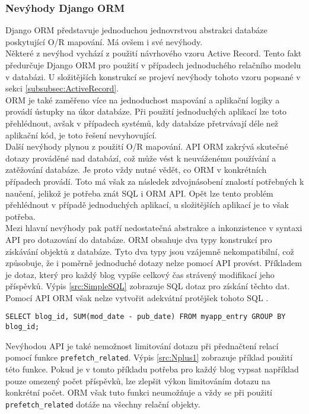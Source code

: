 \documentclass[ing,male,java,dept456]{diploma}						%
\begin{document}
\subsubsection{Nevýhody Django ORM}

Django ORM představuje jednoduchou jednovrstvou abstrakci databáze poskytující O/R mapování. Má ovšem i své nevýhody. \\
Některé z nevýhod vychází z použití návrhového vzoru Active Record. Tento fakt předurčuje Django ORM pro použití v případech jednoduchého relačního modelu v databázi. U složitějších konstrukcí se projeví nevýhody tohoto vzoru popsané v sekci \ref{subsubsec:ActiveRecord}. \\
ORM je také zaměřeno více na jednoduchost mapování a aplikační logiky a provádí ústupky na úkor databáze. Při použití jednoduchých aplikací lze toto přehlédnout, avšak v případech systémů, kdy databáze přetrvávají déle než aplikační kód, je toto řešení nevyhovující. \\
Další nevýhody plynou z použití O/R mapování. API ORM zakrývá skutečné dotazy prováděné nad databází, což může vést k neuváženému používání a zatěžování databáze. Je proto vždy nutné vědět, co ORM v konkrétních případech provádí. Toto má však za následek zdvojnásobení znalostí potřebných k naučení, jelikož je potřeba znát SQL i ORM API. Opět lze tento problém přehlédnout v případě jednoduchých aplikací, u složitějších aplikací je to však potřeba. \\
Mezi hlavní nevýhody pak patří nedostatečná abstrakce a inkonzistence v syntaxi API pro dotazování do databáze. ORM obsahuje dva typy konstrukcí pro získávání objektů z databáze. Tyto dva typy jsou vzájemně nekompatibilní, což způsobuje, že i poměrně jednoduché dotazy nelze pomocí API provést. Příkladem je dotaz, který pro každý blog vypíše celkový čas strávený modifikací jeho příspěvků. Výpis \ref{src:SimpleSQL} zobrazuje SQL dotaz pro získání těchto dat. Pomocí API ORM však nelze vytvořit adekvátní protějšek tohoto SQL \cite{dj-dis}.
\begin{lstlisting}[style=customsql, label=src:SimpleSQL, caption={Příklad dotazu, který nelze provést pomocí Django ORM API}]
SELECT blog_id, SUM(mod_date - pub_date) FROM myapp_entry GROUP BY blog_id;
\end{lstlisting}

Nevýhodou API je také nemožnost limitování dotazu při přednačtení relací pomocí funkce \lstinline[style=custompython]|prefetch_related|. Výpis \ref{src:Nplus1} zobrazuje příklad použití této funkce. Pokud je v tomto příkladu potřeba pro každý blog vypsat například pouze omezený počet příspěvků, lze zlepšit výkon limitováním dotazu na konkrétní počet. ORM však tuto funkci neumožňuje a vždy se při použití \lstinline[style=custompython]|prefetch_related| dotáže na všechny relační objekty. \\
\end{document}
